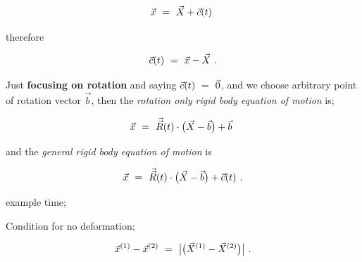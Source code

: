 \documentclass{article}
\newcounter{subsubsubsection}[subsubsection]
\begin{document}
\begin{equation} \label{eq:1}
\vec{x} \hspace{0.125cm} = \hspace{0.125cm} \vec{X} + \vec{c}(t)   \hspace{0.125cm} 
\end{equation}

therefore 

\begin{equation} \label{eq:1}
\vec{c}(t) \hspace{0.125cm} = \hspace{0.125cm} \vec{x} - \vec{X} \hspace{0.125cm} .
\end{equation}

Just \textbf{focusing on rotation} and saying \begin{math} \vec{c}(t) \hspace{0.125cm} = \hspace{0.125cm} \vec{0} \end{math}, and we choose arbitrary point of rotation vector \begin{math} \vec{b} \end{math}, then the \textit{rotation only rigid body equation of motion} is;

\begin{equation} \label{eq:1}
\vec{x} \hspace{0.125cm} = \hspace{0.125cm} \vec{\vec{R}}(t) \cdot \big( \vec{X} - \vec{b} \big) + \vec{b}   \hspace{0.125cm} 
\end{equation}

and the \textit{general rigid body equation of motion} is 

\begin{equation} \label{eq:1}
\vec{x} \hspace{0.125cm} = \hspace{0.125cm} \vec{\vec{R}}(t) \cdot \big( \vec{X} - \vec{b} \big) + \vec{c}(t)  \hspace{0.125cm} .
\end{equation}

example time;


Condition for no deformation;

\begin{equation} \label{eq:1}
\vec{x}^{(1)} - \vec{x}^{(2)} \hspace{0.125cm} = \hspace{0.125cm} \big| \big( \vec{X}^{(1)} - \vec{X}^{(2)} \big) \big| \hspace{0.125cm} .
\end{equation}
\end{document}
